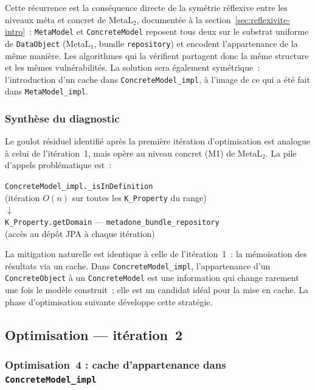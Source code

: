 Cette récurrence est la conséquence directe de la symétrie réflexive
entre les niveaux méta et concret de MetaL$_2$, documentée à la
section~\ref{sec:reflexivite-intro}~: \texttt{MetaModel} et
\texttt{ConcreteModel} reposent tous deux sur le substrat uniforme
de \texttt{DataObject} (MetaL$_1$, bundle \texttt{repository}) et
encodent l'appartenance de la même manière. Les algorithmes qui la
vérifient partagent donc la même structure et les mêmes
vulnérabilités. La solution sera également symétrique~: l'introduction
d'un cache dans \texttt{ConcreteModel\_impl}, à l'image de ce qui a
été fait dans \texttt{MetaModel\_impl}.

\subsubsection{Synthèse du diagnostic}

Le goulot résiduel identifié après la première itération d'optimisation est
analogue à celui de l'itération~1, mais opère au niveau concret (M1) de
MetaL$_2$.
La pile d'appels problématique est~:

\begin{center}
\small
\texttt{ConcreteModel\_impl.\_isInDefinition} \\
(itération $O(n)$ sur toutes les \texttt{K\_Property} du range) \\[4pt]
$\downarrow$ \\[4pt]
\texttt{K\_Property.getDomain} ---
\texttt{metadone\_bundle\_repository} \\
(accès au dépôt JPA à chaque itération)
\end{center}

La mitigation naturelle est identique à celle de l'itération~1~: la
mémoïsation des résultats via un cache. Dans
\texttt{ConcreteModel\_impl}, l'appartenance d'un
\texttt{ConcreteObject} à un \texttt{ConcreteModel} est une information
qui change rarement une fois le modèle construit~; elle est un candidat
idéal pour la mise en cache. La phase d'optimisation suivante développe
cette stratégie.

\subsection{Optimisation --- itération~2}
\label{sec:scenario1-opti2}

\subsubsection{Optimisation~4 : cache d'appartenance dans
\texttt{ConcreteModel\_impl}}
\label{sec:opti4}

